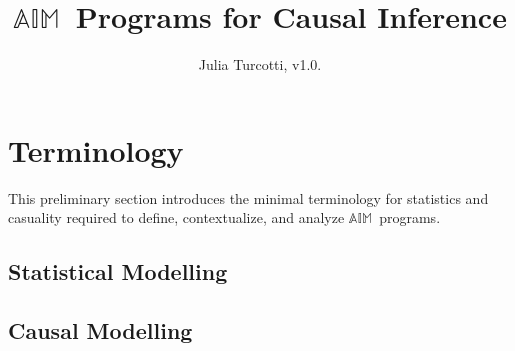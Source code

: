 \documentclass{article}
\begin{document}
\newcommand{\A}{\ensuremath{\mathbb{A}}}
\newcommand{\I}{\ensuremath{\mathbb{I}}}
\newcommand{\M}{\ensuremath{\mathbb{M}}}
\newcommand{\AIM}{\A\I\M~}


\title{\AIM Programs for Causal Inference}
\author{Julia Turcotti, v1.0.\vcounter}
\maketitle

\tableofcontents

\newpage

\section{Terminology}
\label{t}

This preliminary section introduces the minimal terminology for statistics and casuality required to define, contextualize, and analyze \AIM programs.

\subsection{Statistical Modelling}
\label{sm}

\newcommand{\X}{\mathcal{X}}
\renewcommand{\P}{\mathcal{P}}
\newcommand{\D}{\mathcal{D}}

\subsection{Causal Modelling}
\label{cm}
\end{document}
